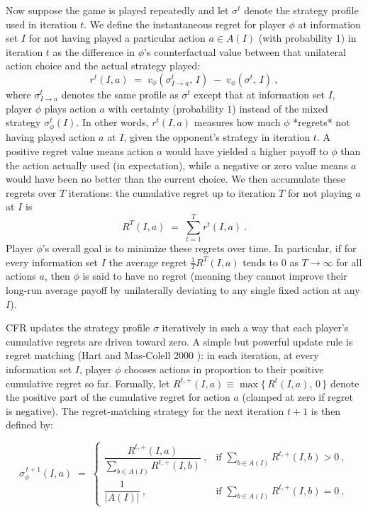 \documentclass{article}
\begin{document}
Now suppose the game is played repeatedly and let $\sigma^t$ denote the strategy profile used in iteration $t$. We define the instantaneous regret for player $\phi$ at information set $I$ for not having played a particular action $a \in A(I)$ (with probability 1) in iteration $t$ as the difference in $\phi$’s counterfactual value between that unilateral action choice and the actual strategy played: 
\[
r^t(I,a) \;=\; v_{\phi}(\sigma^t_{I \to a},\, I)\;-\;v_{\phi}(\sigma^t,\, I)~,
\] 
where $\sigma^t_{I \to a}$ denotes the same profile as $\sigma^t$ except that at information set $I$, player $\phi$ plays action $a$ with certainty (probability $1$) instead of the mixed strategy $\sigma^t_\phi(I)$. In other words, $r^t(I,a)$ measures how much $\phi$ *regrets* not having played action $a$ at $I$, given the opponent’s strategy in iteration $t$. A positive regret value means action $a$ would have yielded a higher payoff to $\phi$ than the action actually used (in expectation), while a negative or zero value means $a$ would have been no better than the current choice. We then accumulate these regrets over $T$ iterations: the cumulative regret up to iteration $T$ for not playing $a$ at $I$ is 
\[ 
R^T(I,a) \;=\; \sum_{t=1}^{T} r^t(I,a)~. 
\] 
Player $\phi$’s overall goal is to minimize these regrets over time. In particular, if for every information set $I$ the average regret $\frac{1}{T}R^T(I,a)$ tends to $0$ as $T\to\infty$ for all actions $a$, then $\phi$ is said to have no regret (meaning they cannot improve their long-run average payoff by unilaterally deviating to any single fixed action at any $I$).

CFR updates the strategy profile $\sigma$ iteratively in such a way that each player’s cumulative regrets are driven toward zero. A simple but powerful update rule is regret matching (Hart and Mas-Colell 2000 \cite{hartmascolell}): in each iteration, at every information set $I$, player $\phi$ chooses actions in proportion to their positive cumulative regret so far. Formally, let $R^{t,+}(I,a) \equiv \max\{\,R^t(I,a),\,0\,\}$ denote the positive part of the cumulative regret for action $a$ (clamped at zero if regret is negative). The regret-matching strategy for the next iteration $t\!+\!1$ is then defined by: 

\begin{equation}\label{eq:regret-matching}
\sigma_{\phi}^{\,t+1}(I,a) \;=\; 
\begin{cases}
\dfrac{R^{t,+}(I,a)}{\sum_{b \in A(I)} R^{t,+}(I,b)}~, & \text{if }\sum_{b \in A(I)}R^{t,+}(I,b) > 0~, \\[2ex]
\dfrac{1}{\lvert A(I)\rvert}~, & \text{if }\sum_{b \in A(I)}R^{t,+}(I,b) = 0~,
\end{cases}
\end{equation}
\end{document}
